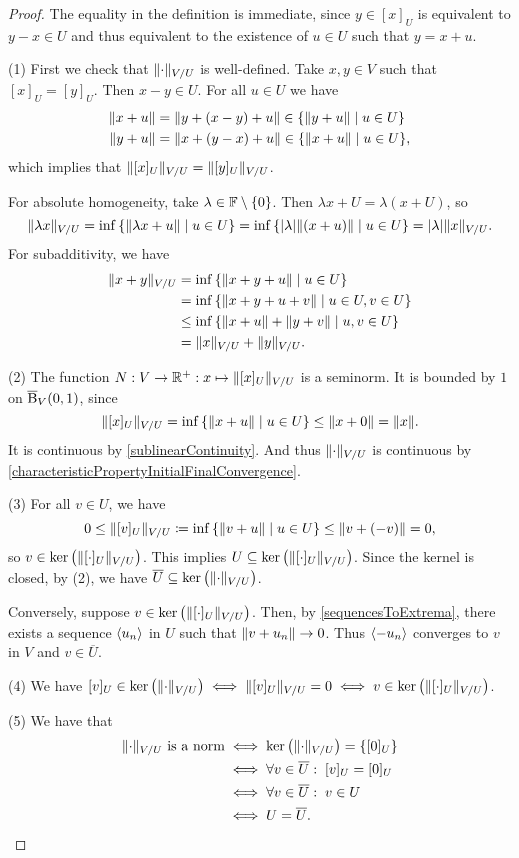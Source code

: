 \begin{proof}
The equality in the definition is immediate, since $y \in [x]_U$ is equivalent to $y-x \in U$ and thus equivalent to the existence of $u\in U$ such that $y = x+u$. 

(1) First we check that $\lVert\cdot\rVert_{V/U}$ is well-defined. Take $x,y\in V$ such that $[x]_U = [y]_U$. Then $x-y \in U$. For all $u\in U$ we have
\begin{align*}
\norm{x+u} &= \norm{y + (x-y)+u} \in \setbuilder{\norm{y+u}}{u\in U} \\
\norm{y+u} &= \norm{x + (y-x)+u} \in \setbuilder{\norm{x+u}}{u\in U}, 
\end{align*}
which implies that $\lVert[x]_U\rVert_{V/U} = \lVert[y]_U\rVert_{V/U}$.

For absolute homogeneity, take $\lambda\in\mathbb{F}\setminus\{0\}$. Then $\lambda x+U = \lambda(x+U)$, so
\[ \norm{\lambda x}_{V/U} = \inf\setbuilder{\norm{\lambda x+u}}{u\in U} = \inf\setbuilder{|\lambda|\norm{(x+u)}}{u\in U} = |\lambda| \norm{x}_{V/U}. \]
For subadditivity, we have
\begin{align*}
\norm{x+y}_{V/U} &= \inf\setbuilder{\norm{x+y+u}}{u\in U} \\
&= \inf\setbuilder{\norm{x+y+u+v}}{u\in U, v\in U} \\
&\leq \inf\setbuilder{\norm{x+u}+\norm{y+v}}{u,v\in U} \\
&= \norm{x}_{V/U} + \norm{y}_{V/U}.
\end{align*}

(2) The function $N: V\to \mathbb{R}^+: x\mapsto \lVert[x]_U\rVert_{V/U}$ is a seminorm. It is bounded by $1$ on $\operatorname{\overline{B}}_V(0,1)$, since
\[ \norm{[x]_U}_{V/U} = \inf\setbuilder{\norm{x+u}}{u\in U} \leq \norm{x+0} = \norm{x}. \]
It is continuous by \ref{sublinearContinuity}. And thus $\lVert\cdot\rVert_{V/U}$ is continuous by \ref{characteristicPropertyInitialFinalConvergence}.

(3) For all $v\in U$, we have
\[ 0 \leq \norm{[v]_U}_{V/U} \defeq \inf\setbuilder{\norm{v+u}}{u\in U} \leq \norm{v + (-v)} = 0, \]
so $v\in \ker\big(\lVert[\cdot]_U\rVert_{V/U}\big)$. This implies $U \subseteq \ker\big(\lVert[\cdot]_U\rVert_{V/U}\big)$. Since the kernel is closed, by (2), we have $\overline{U} \subseteq \ker\big(\lVert\cdot\rVert_{V/U}\big)$.

Conversely, suppose $v\in \ker\big(\lVert[\cdot]_U\rVert_{V/U}\big)$. Then, by \ref{sequencesToExtrema}, there exists a sequence $\left\langle u_n \right\rangle$ in $U$ such that $\lVert v+ u_n\rVert \to 0$. Thus $\left\langle -u_n \right\rangle$ converges to $v$ in $V$ and $v\in \overline{U}$.

(4) We have $[v]_U \in \ker\big(\lVert\cdot\rVert_{V/U}\big) \iff \lVert[v]_U\rVert_{V/U} = 0 \iff v\in \ker\big(\lVert[\cdot]_U\rVert_{V/U}\big)$.

(5) We have that
\begin{align*}
\text{$\lVert\cdot\rVert_{V/U}$ is a norm} &\iff \ker\big(\lVert\cdot\rVert_{V/U}\big) = \{[0]_U\} \\
&\iff \forall v\in \overline{U}: \; [v]_U = [0]_U \\
&\iff \forall v\in \overline{U}: \; v\in U \\
&\iff U = \overline{U}.
\end{align*}
\end{proof}

